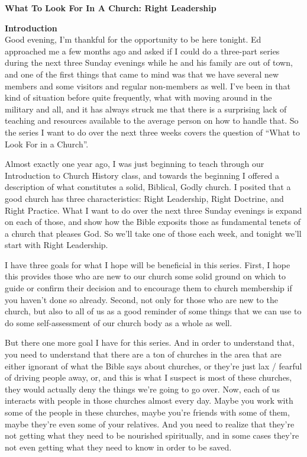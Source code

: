 \documentclass[letterpaper, 12pt]{article}
\begin{document}
    \thispagestyle{empty}

    \begin{center}

        \textbf{\large{What To Look For In A Church: Right Leadership}}

    \end{center}

    \noindent \textbf{Introduction} \\

    Good evening, I'm thankful for the opportunity to be here tonight.
    Ed approached me a few months ago and asked if I could do a
    three-part series during the next three Sunday evenings while he and
    his family are out of town, and one of the first things that came to
    mind was that we have several new members and some visitors and
    regular non-members as well. I've been in that kind of situation
    before quite frequently, what with moving around in the military and
    all, and it has always struck me that there is a surprising lack of
    teaching and resources available to the average person on how to
    handle that. So the series I want to do over the next three weeks
    covers the question of ``What to Look For in a Church''.

    Almost exactly one year ago, I was just beginning to teach through
    our Introduction to Church History class, and towards the beginning
    I offered a description of what constitutes a solid, Biblical, Godly
    church. I posited that a good church has three characteristics:
    Right Leadership, Right Doctrine, and Right Practice. What I want to
    do over the next three Sunday evenings is expand on each of those,
    and show how the Bible exposits those as fundamental tenets of a
    church that pleases God. So we'll take one of those each week, and
    tonight we'll start with Right Leadership.

    I have three goals for what I hope will be beneficial in this series.
    First, I hope this provides those who are new to our church some
    solid ground on which to guide or confirm their decision and to
    encourage them to church membership if you haven't done so already.
    Second, not only for those who are new to the church, but also to
    all of us as a good reminder of some things that we can use to do
    some self-assessment of our church body as a whole as well. 

    But there one more goal I have for this series. And in order to
    understand that, you need to understand that there are a ton of
    churches in the area that are either ignorant of what the Bible says
    about churches, or they're just lax / fearful of driving people
    away, or, and this is what I suspect is most of these churches, they
    would actually deny the things we're going to go over. Now, each of
    us interacts with people in those churches almost every day. Maybe
    you work with some of the people in these churches, maybe you're
    friends with some of them, maybe they're even some of your
    relatives. And you need to realize that they're not getting what
    they need to be nourished spiritually, and in some cases they're not
    even getting what they need to know in order to be saved.
\end{document}
